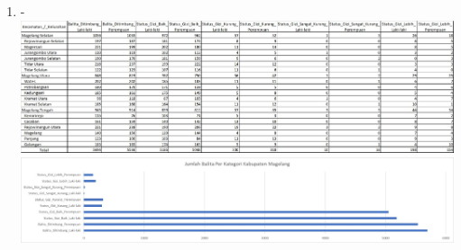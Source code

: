\documentclass[12pt,titlepage]{article}
\begin{document}
\begin{enumerate}
    \item - \\ \includegraphics[width=.9\textwidth]{images/figures/Jumlah_Balita_Tabel.jpeg} \\ \includegraphics[width=.9\textwidth]{images/figures/Jumlah_Balita_Diagram.jpeg}
\end{enumerate}
\end{document}

